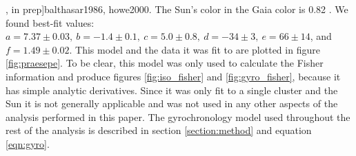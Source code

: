 \etal, in prep]{balthasar1986, howe2000}.
The Sun's color in the Gaia color is 0.82 \citep{casagrande2018}.
We found best-fit values: $a = 7.37 \pm 0.03,~b = -1.4 \pm 0.1,~c = 5.0 \pm
0.8,~d = -34 \pm 3,~e = 66 \pm 14$, and $f = 1.49 \pm 0.02$.
This model and the data it was fit to are plotted in figure
\ref{fig:praesepe}.
To be clear, this model was only used to calculate the Fisher information and
produce figures \ref{fig:iso_fisher} and \ref{fig:gyro_fisher}, because it has
simple analytic derivatives.
Since it was only fit to a single cluster and the Sun it is not generally
applicable and was not used in any other aspects of the analysis performed in
this paper.
The gyrochronology model used throughout the rest of the analysis is described
in section \ref{section:method} and equation \ref{eqn:gyro}.



